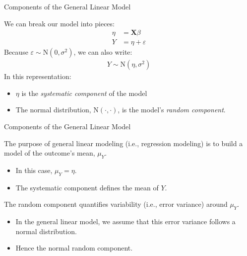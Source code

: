 \documentclass{beamer}\usepackage[]{graphicx}\usepackage[]{color}
\begin{document}

\begin{frame}{Components of the General Linear Model}
 
  We can break our model into pieces:
  \begin{align*}
    \eta &= \mathbf{X} \beta\\
    Y &= \eta + \varepsilon
  \end{align*}
  Because $\varepsilon \sim \text{N}(0, \sigma^2)$, we can also write:
  \begin{align*}
    Y \sim \text{N}(\eta, \sigma^2)
  \end{align*}
  In this representation:
  \vc
  \begin{itemize}
  \item $\eta$ is the \emph{systematic component} of the model
    \vc
  \item The normal distribution, $\text{N}(\cdot, \cdot)$, is the model's 
    \emph{random component}.
  \end{itemize}
  
\end{frame}


\begin{frame}{Components of the General Linear Model}
  
  The purpose of general linear modeling (i.e., regression modeling) is to build
  a model of the outcome's mean, $\mu_Y$.  
  \vb
  \begin{itemize}
  \item In this case, $\mu_Y = \eta$.
    \vc
  \item The systematic component defines the mean of $Y$.
  \end{itemize}
  \vb 
  The random component quantifies variability (i.e., error variance) around
  $\mu_Y$.  
  \vb
  \begin{itemize}
  \item In the general linear model, we assume that this error variance follows
    a normal distribution.
    \vc
  \item Hence the normal random component.
  \end{itemize}
  
\end{frame}

\end{document}

